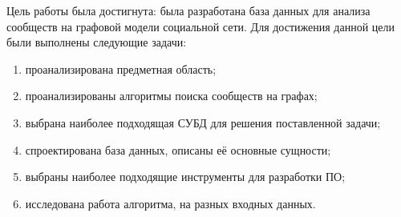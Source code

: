 
Цель работы была достигнута: была разработана база данных для анализа сообществ на графовой модели социальной сети. Для достижения данной цели были выполнены следующие задачи:

\begin{enumerate}
\item проанализирована предметная область;
\item проанализированы алгоритмы поиска сообществ на графах;
\item выбрана наиболее подходящая СУБД для решения поставленной задачи;
\item спроектирована база данных, описаны её основные сущности;
\item выбраны наиболее подходящие инструменты для разработки ПО;
\item исследована работа алгоритма, на разных входных данных.
\end{enumerate}